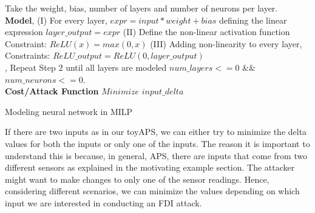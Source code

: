 \begin{algorithm}
	Take the weight, bias, number of layers and number of neurons per layer. \\
	
	\textbf{Model}, \linebreak
	(I) For every  layer,  $expr = input * weight + bias$
	\linebreak 
	defining the linear expression
	\linebreak
	$layer\_output = expr$
	\linebreak
	(II) Define the non-linear activation function 
	\linebreak 
	\qquad Constraint: $ReLU(x) = max (0,x)$
	\linebreak
	(III) Adding non-linearity to every layer,
	\linebreak
	Constraints: $ReLU\_output = ReLU(0, layer\_output)$\\, 
	Repeat Step 2 until all layers are modeled 
	\linebreak
	$num\_layers < = 0$   $ \&\& $ 
	$ num\_neurons < = 0 $.\\
	
	\textbf{Cost/Attack Function} \linebreak
	$Minimize $  $input\_delta$
	\caption{Modeling neural network in MILP}
	\label{algo:b}
\end{algorithm}

If there are two inputs as in our toyAPS, we can either try to minimize the delta values for both the inputs or only one of the inputs. The reason it is important to understand this is because, in general, APS, there are inputs that come from two different sensors as explained in the motivating example section. 
The attacker might want to make changes to only one of the sensor readings. Hence, considering different scenarios, we can minimize the values depending on which input we are interested in conducting an FDI attack.  


